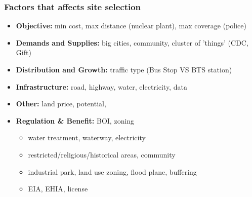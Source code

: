 \documentclass[10pt,handout,notes=show]{beamer}
\begin{document}
\begin{frame}
  \frametitle{Factors that affects site selection}

  \begin{itemize}
    \item \textbf{Objective:} min cost, max distance (nuclear plant), max coverage (police)
    \item \textbf{Demands and Supplies:} big cities, community, cluster of 'things' (CDC, Gift)
    \item \textbf{Distribution and Growth:} traffic type (Bus Stop VS BTS station)
    \item \textbf{Infrastructure:} road, highway, water, electricity, data
    \item \textbf{Other:} land price, potential,
    \item \textbf{Regulation \& Benefit:} BOI, zoning
    \begin{itemize}
      \item \textbf{} water treatment, waterway, electricity
      \item \textbf{} restricted/religious/historical areas, community
      \item \textbf{} industrial park, land use zoning, flood plane, buffering
      \item \textbf{} EIA, EHIA, license
    \end{itemize}
  \end{itemize}

\end{frame}
\end{document}
